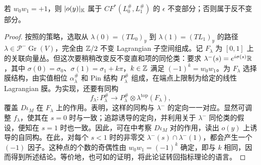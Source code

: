 \begin{lemma}\label{st:14.11}
若 $w_0w_1=+1$，则 $|o(y)|_{\mathbb K}$ 属于 $CF^*(L_0^\#,L_1^\#)$ 的 $\epsilon$ 不变部分；否则属于反不变部分。
\end{lemma}
\begin{proof}
按照的策略，选取从 $\lambda(0)=(TL_0)_y$ 到 $\lambda(1)=(TL_1)_y$ 的路径 $\lambda\in\mathcal P^-\operatorname{Gr}(V)$，完全由 $\mathbb Z/2$ 不变 Lagrangian 子空间组成。记 $F_\lambda$ 为 $[0,1]$ 上的关联向量丛。但这次要稍稍改变反不变直和项的同伦类：要求 $\lambda^-(s)=e^{i\sigma(s)}\mathbb R$，其中 $\sigma(0)=\sigma_0$、$\sigma(1)=\sigma_1+k\pi$，$k\in\mathbb Z$ 满足 $(-1)^k=w_0w_1$。为 $F_\lambda$ 选择膜结构，由实值相位 $\alpha_\lambda^\#$ 和 Pin 结构 $P_\lambda^\#$ 组成，在端点上限制为给定的线性 Lagrangian 膜。为实现，还要有同构
\[
f_\lambda:P_\lambda^\#\longrightarrow P_\lambda^\#\otimes\lambda^{\mathrm{top}}(F_\lambda),
\]
覆盖 $D\iota_M$ 在 $F_\lambda$ 上的作用。表明，这样的同构与 $\lambda^-$ 的定向一一对应。显然可调整 $f_\lambda$，使其在 $s=0$ 时与一致；追踪诱导的定向，并利用关于 $\lambda^-$ 同伦类的假设，便知在 $s=1$ 时也一致。因此，可在中考察 $D\iota_M$ 对的作用，读出 $o(y)$ 上诱导的自同构。在此，对每个 $s<1$ 时的非零交 $\lambda^-(s)\cap\lambda^-(1)$，都会产生一个 $(-1)$ 因子。这种点的个数的奇偶性由 $w_0w_1=(-1)^k$ 确定，即与 $k$ 相同，因而得到所述结论。等价地，也可如的证明，将此论证转回指标理论的语言。
\end{proof}
